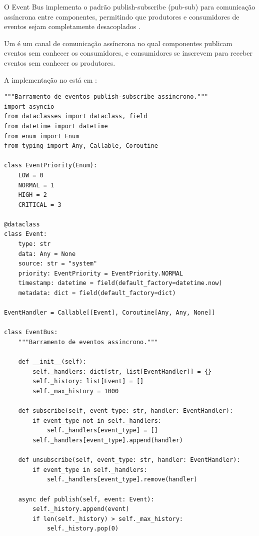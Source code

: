 O Event Bus implementa o padrão publish-subscribe (pub-sub) para
comunicação assíncrona entre componentes, permitindo que produtores e
consumidores de eventos sejam completamente desacoplados
\cite{pressman2016engenharia}.

\begin{definicao}
Um  é um canal de comunicação
assíncrona no qual componentes publicam eventos sem conhecer os
consumidores, e consumidores se inscrevem para receber eventos sem
conhecer os produtores.
\end{definicao}

A implementação no \opencodeeco{} está em :

\begin{lstlisting}[style=pythonstyle, caption={Event Bus assincrono},
                   label={lst:event-bus}]
"""Barramento de eventos publish-subscribe assincrono."""
import asyncio
from dataclasses import dataclass, field
from datetime import datetime
from enum import Enum
from typing import Any, Callable, Coroutine

class EventPriority(Enum):
    LOW = 0
    NORMAL = 1
    HIGH = 2
    CRITICAL = 3

@dataclass
class Event:
    type: str
    data: Any = None
    source: str = "system"
    priority: EventPriority = EventPriority.NORMAL
    timestamp: datetime = field(default_factory=datetime.now)
    metadata: dict = field(default_factory=dict)

EventHandler = Callable[[Event], Coroutine[Any, Any, None]]

class EventBus:
    """Barramento de eventos assincrono."""

    def __init__(self):
        self._handlers: dict[str, list[EventHandler]] = {}
        self._history: list[Event] = []
        self._max_history = 1000

    def subscribe(self, event_type: str, handler: EventHandler):
        if event_type not in self._handlers:
            self._handlers[event_type] = []
        self._handlers[event_type].append(handler)

    def unsubscribe(self, event_type: str, handler: EventHandler):
        if event_type in self._handlers:
            self._handlers[event_type].remove(handler)

    async def publish(self, event: Event):
        self._history.append(event)
        if len(self._history) > self._max_history:
            self._history.pop(0)


\end{lstlisting}
